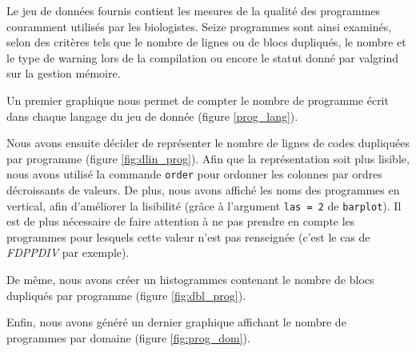 Le jeu de données fournis contient les mesures de la qualité des
programmes couramment utilisés par les biologistes. Seize programmes
sont ainsi examinés, selon des critères tels que le nombre de lignes ou
de blocs dupliqués, le nombre et le type de warning lors de la
compilation ou encore le statut donné par valgrind sur la gestion
mémoire.

Un premier graphique nous permet de compter le nombre de programme
écrit dans chaque langage du jeu de donnée (figure \ref{prog_lang}).


Nous avons ensuite décider de représenter le nombre de lignes de codes
dupliquées par programme (figure \ref{fig:dlin_prog}). Afin que la
représentation soit plus lisible, nous avons utilisé la commande
\lstinline{order} pour ordonner les colonnes par ordres décroissants
de valeurs. De plus, nous avons affiché les noms des programmes en
vertical, afin d'améliorer la lisibilité (grâce à l'argument
\lstinline{las = 2} de \lstinline{barplot}). Il est de plus nécessaire
de faire attention à ne pas prendre en compte les programmes pour
lesquels cette valeur n'est pas renseignée (c'est le cas de \emph{FDPPDIV}
par exemple).


De même, nous avons créer un histogrammes contenant le nombre de blocs
dupliqués par programme (figure \ref{fig:dbl_prog}).


Enfin, nous avons généré un dernier graphique affichant le nombre de
programmes par domaine (figure \ref{fig:prog_dom}).

